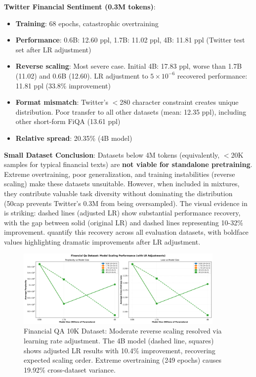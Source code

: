 \textbf{Twitter Financial Sentiment (0.3M tokens)}:
\begin{itemize}
\item \textbf{Training}: 68 epochs, catastrophic overtraining
\item \textbf{Performance}: 0.6B: 12.60 ppl, 1.7B: 11.02 ppl, 4B: 11.81 ppl (Twitter test set after LR adjustment)
\item \textbf{Reverse scaling}: Most severe case. Initial 4B: 17.83 ppl, worse than 1.7B (11.02) and 0.6B (12.60). LR adjustment to $5 \times 10^{-6}$ recovered performance: 11.81 ppl (33.8\% improvement)
\item \textbf{Format mismatch}: Twitter's $<$280 character constraint creates unique distribution. Poor transfer to all other datasets (mean: 12.35 ppl), including other short-form FiQA (13.61 ppl)
\item \textbf{Relative spread}: 20.35\% (4B model)
\end{itemize}

\textbf{Small Dataset Conclusion}: Datasets below 4M tokens (equivalently, $<$20K samples for typical financial texts) are \textbf{not viable for standalone pretraining}. Extreme overtraining, poor generalization, and training instabilities (reverse scaling) make these datasets unsuitable. However, when included in mixtures, they contribute valuable task diversity without dominating the distribution (50cap prevents Twitter's 0.3M from being oversampled). The visual evidence in  is striking: dashed lines (adjusted LR) show substantial performance recovery, with the gap between solid (original LR) and dashed lines representing 10-32\% improvement.  quantify this recovery across all evaluation datasets, with boldface values highlighting dramatic improvements after LR adjustment.

\begin{figure}[h]
\centering
\includegraphics[width=0.9\textwidth]{figures/scaling_financial_qa.png}
\caption[Financial QA 10K Dataset: Reverse Scaling]{Financial QA 10K Dataset: Moderate reverse scaling resolved via learning rate adjustment. The 4B model (dashed line, squares) shows adjusted LR results with 10.4\% improvement, recovering expected scaling order. Extreme overtraining (249 epochs) causes 19.92\% cross-dataset variance.}
\label{fig:scaling_financial_qa}
\end{figure}

